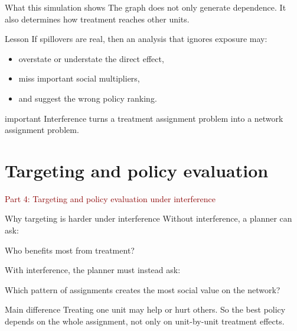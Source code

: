 \documentclass[dvipsnames,aspectratio=169,handout]{beamer}
\begin{document}
\begin{frame}{What this simulation shows}
The graph does not only generate dependence.
It also determines how treatment reaches other units.

\begin{block}{Lesson}
If spillovers are real, then an analysis that ignores exposure may:
\begin{itemize}
    \item overstate or understate the direct effect,
    \item miss important social multipliers,
    \item and suggest the wrong policy ranking.
\end{itemize}
\end{block}

\begin{beamercolorbox}[wd=\textwidth,sep=8pt,center,rounded=true,shadow=true]{important}
Interference turns a treatment assignment problem into a network assignment problem.
\end{beamercolorbox}
\end{frame}


\section{Targeting and policy evaluation}

\begin{frame}{}
\begin{center}
{\Huge \textcolor{DarkRed}{Part 4: Targeting and policy evaluation under interference}}
\end{center}
\end{frame}

\begin{frame}{Why targeting is harder under interference}
Without interference, a planner can ask:
\begin{center}
Who benefits most from treatment?
\end{center}

With interference, the planner must instead ask:
\begin{center}
Which pattern of assignments creates the most social value on the network?
\end{center}

\begin{alertblock}{Main difference}
Treating one unit may help or hurt others.
So the best policy depends on the whole assignment, not only on unit-by-unit treatment effects.
\end{alertblock}
\end{frame}
\end{document}
